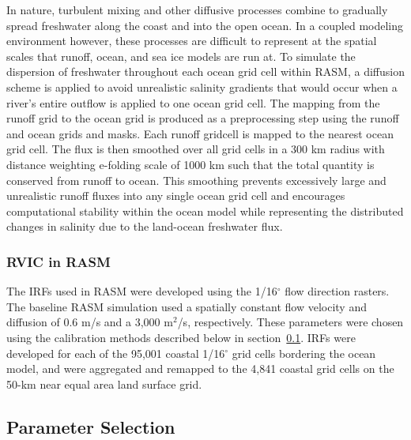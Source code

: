 \documentclass[jgrga, draft]{agutex}
\begin{document}
\begin{article}
In nature, turbulent mixing and other diffusive processes combine to gradually spread freshwater along the coast and into the open ocean.
In a coupled modeling environment however, these processes are difficult to represent at the spatial scales that runoff, ocean, and sea ice models are run at.
To simulate the dispersion of freshwater throughout each ocean grid cell within RASM, a diffusion scheme is applied to avoid unrealistic salinity gradients that would occur when a river’s entire outflow is applied to one ocean grid cell.
The mapping from the runoff grid to the ocean grid is produced as a preprocessing step using the runoff and ocean grids and masks.
Each runoff gridcell is mapped to the nearest ocean grid cell.
The flux is then smoothed over all grid cells in a 300 km radius with distance weighting e-folding scale of 1000 km such that the total quantity is conserved from runoff to ocean.
This smoothing prevents excessively large and unrealistic runoff fluxes into any single ocean grid cell and encourages computational stability within the ocean model while representing the distributed changes in salinity due to the land-ocean freshwater flux.

\subsubsection{RVIC in RASM}

The IRFs used in RASM were developed using the \citet{Wu_2011} 1/16$^{\circ}$ flow direction rasters.
The baseline RASM simulation used a spatially constant flow velocity and diffusion of 0.6 m/s and a 3,000 m$^2$/s, respectively.
These parameters were chosen using the calibration methods described below in section~\ref{sec:parameters}.
IRFs were developed for each of the 95,001 coastal 1/16$^{\circ}$ grid cells bordering the ocean model, and were aggregated and remapped to the 4,841 coastal grid cells on the 50-km near equal area land surface grid.

\subsection{Parameter Selection}
\label{sec:parameters}


\end{article}
\end{document}
